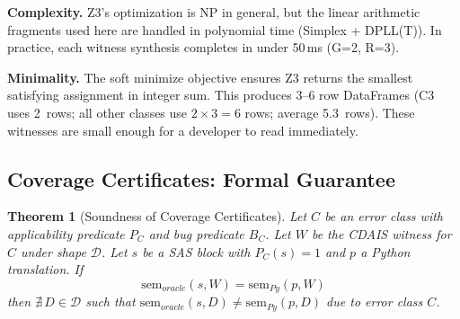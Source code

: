 \documentclass[conference]{IEEEtran}
\newtheorem{theorem}{Theorem}
\begin{document}
\textbf{Complexity.} Z3's optimization is NP in general, but the linear arithmetic
fragments used here are handled in polynomial time (Simplex + DPLL(T)). In practice,
each witness synthesis completes in under 50\,ms (G=2, R=3).

\textbf{Minimality.} The soft minimize objective ensures Z3 returns the smallest
satisfying assignment in integer sum. This produces 3--6 row DataFrames (C3 uses
2~rows; all other classes use $2 \times 3 = 6$ rows; average 5.3~rows). These
witnesses are small enough for a developer to read immediately.

\subsection{Coverage Certificates: Formal Guarantee}

\begin{theorem}[Soundness of Coverage Certificates]
\label{thm:soundness}
Let $C$ be an error class with applicability predicate $P_C$ and bug predicate $B_C$.
Let $W$ be the CDAIS witness for $C$ under shape $\mathcal{D}$. Let $s$ be a SAS
block with $P_C(s) = 1$ and $p$ a Python translation. If
\[
  \text{sem}_{oracle}(s, W) = \text{sem}_{Py}(p, W)
\]
then $\nexists\, D \in \mathcal{D}$ such that $\text{sem}_{oracle}(s, D) \neq
\text{sem}_{Py}(p, D)$ due to error class $C$.
\end{theorem}
\end{document}
